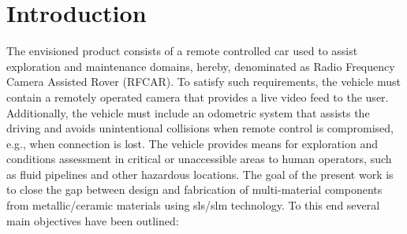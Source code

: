 \chapter{Introduction}%
\label{ch:intro}
The envisioned product consists of a remote controlled car used to assist
exploration and maintenance domains, hereby, denominated as Radio Frequency
Camera Assisted Rover (RFCAR). To satisfy such requirements, the vehicle must
contain a remotely operated camera that provides a live video feed to the user.
Additionally, the vehicle must include an odometric system that assists the
driving and avoids unintentional collisions when remote control is compromised, e.g., when connection is lost.
The vehicle provides means for exploration and conditions assessment in critical
or unaccessible areas to human operators, such as fluid pipelines and other
hazardous locations.
The goal of the present work is to close the gap between design and fabrication of
multi-material components from metallic/ceramic materials using
\gls{sls}/\gls{slm} technology. To this end several main objectives have been
outlined:
%
